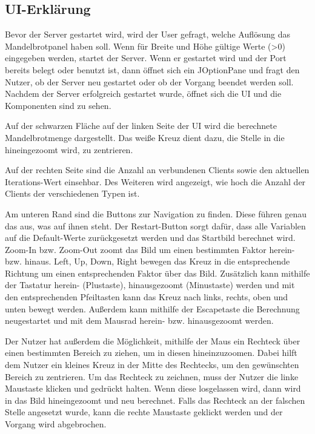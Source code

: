 \documentclass[12pt, onecolumn, notitlepage]{scrartcl}
\begin{document}
\subsection{UI-Erklärung}
Bevor der Server gestartet wird, wird der User gefragt, welche Auflösung das Mandelbrotpanel haben soll. Wenn für Breite und Höhe gültige Werte (>0) eingegeben werden, startet der Server. Wenn er gestartet wird und der Port bereits belegt oder benutzt ist, dann öffnet sich ein JOptionPane und fragt den Nutzer, ob der Server neu gestartet oder ob der Vorgang beendet werden soll. Nachdem der Server erfolgreich gestartet wurde, öffnet sich die UI und die Komponenten sind zu sehen. \par
Auf der schwarzen Fläche auf der linken Seite der UI wird die berechnete Mandelbrotmenge dargestellt. Das weiße Kreuz dient dazu, die Stelle in die hineingezoomt wird, zu zentrieren. \par
Auf der rechten Seite sind die Anzahl an verbundenen Clients sowie den aktuellen Iterations-Wert einsehbar. Des Weiteren wird angezeigt, wie hoch die Anzahl der Clients der verschiedenen Typen ist. \par
Am unteren Rand sind die Buttons zur Navigation zu finden. Diese führen genau das aus, was auf ihnen steht. Der Restart-Button sorgt dafür, dass alle Variablen auf die Default-Werte zurückgesetzt werden und das Startbild berechnet wird. Zoom-In bzw. Zoom-Out zoomt das Bild um einen bestimmten Faktor herein- bzw. hinaus. Left, Up, Down, Right bewegen das Kreuz in die entsprechende Richtung um einen entsprechenden Faktor über das Bild. Zusätzlich kann mithilfe der Tastatur herein- (Plustaste), hinausgezoomt (Minustaste) werden und mit den entsprechenden Pfeiltasten kann das Kreuz nach links, rechts, oben und unten bewegt werden. Außerdem kann mithilfe der Escapetaste die Berechnung neugestartet und mit dem Mausrad herein- bzw. hinausgezoomt werden. \par
Der Nutzer hat außerdem die Möglichkeit, mithilfe der Maus ein Rechteck über einen bestimmten Bereich zu ziehen, um in diesen hineinzuzoomen. Dabei hilft dem Nutzer ein kleines Kreuz in der Mitte des Rechtecks, um den gewünschten Bereich zu zentrieren. Um das Rechteck zu zeichnen, muss der Nutzer die linke Maustaste klicken und gedrückt halten. Wenn diese losgelassen wird, dann wird in das Bild hineingezoomt und neu berechnet. Falls das Rechteck an der falschen Stelle angesetzt wurde, kann die rechte Maustaste geklickt werden und der Vorgang wird abgebrochen.
\end{document}
